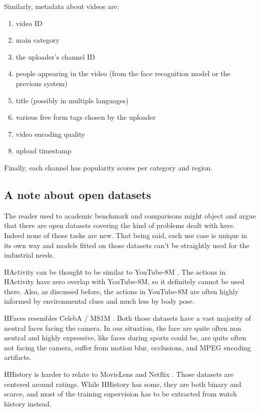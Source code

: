 Similarly, metadata about videos are:

\begin{enumerate}
    \item video ID
    \item main category
    \item the uploader's channel ID
    \item people appearing in the video (from the face recognition model or the previous system)
    \item title (possibly in multiple languages)
    \item various free form tags chosen by the uploader
    \item video encoding quality
    \item upload timestamp
\end{enumerate}

Finally, each channel has popularity scores per category and region.

\subsection{A note about open datasets}

The reader used to academic benchmark and comparisons might object and argue that there are open datasets covering the kind of problems dealt with here. Indeed none of those tasks are new. That being said, each use case is unique in its own way and models fitted on those datasets can't be straightly used for the industrial needs.

HActivity can be thought to be similar to YouTube-8M \citep{youtube8m}. The actions in HActivity have zero overlap with YouTube-8M, so it definitely cannot be used there. Also, as discussed before, the actions in YouTube-8M are often highly informed by environmental clues and much less by body pose.

HFaces resembles CelebA \citep{celeba} / MS1M \citep{celeb1m}. Both those datasets have a vast majority of neutral faces facing the camera. In our situation, the face are quite often non neutral and highly expressive, like faces during sports could be, are quite often not facing the camera, suffer from motion blur, occlusions, and MPEG encoding artifacts.

HHistory is harder to relate to MovieLens \citep{movielens} and Netflix \citep{netflix}. Those datasets are centered around ratings. While HHistory has some, they are both binary and scarce, and most of the training supervision has to be extracted from watch history instead.

